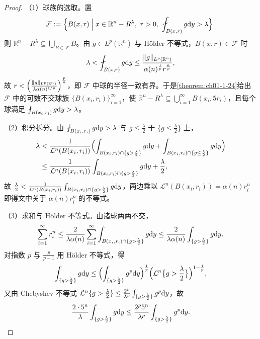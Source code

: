 \documentclass[../../main.tex]{subfiles}%
\begin{document}
\begin{proof}
（1）球族的选取。置
\begin{align*}
\mathcal{F}:=\Bigl\{B(x,r)\Bigm|x\in\mathbb{R}^n-R^\lambda,\ r>0,\ \fint_{B(x,r)}g\diff y>\lambda\Bigr\}.
\end{align*}
则 $\mathbb{R}^n-R^\lambda\subseteq\bigcup_{B\in\mathcal{F}}B$。由 $g\in L^p(\mathbb{R}^n)$ 与 Hölder 不等式，$B(x,r)\in\mathcal{F}$ 时
\begin{align*}
\lambda<\fint_{B(x,r)}g\diff y\le\frac{\lVert g\rVert_{L^p(\mathbb{R}^n)}}{\alpha(n)^{\frac1p}r^{\frac np}},
\end{align*}
故 $r<\Bigl(\frac{\lVert g\rVert_{L^p(\mathbb{R}^n)}}{\lambda\alpha(n)^{1/p}}\Bigr)^{\frac{p}{n}}$，即 $\mathcal{F}$ 中球的半径一致有界。于是\cref{theorem:ch01-1-24}给出 $\mathcal{F}$ 中的可数不交球族 $\{B(x_i,r_i)\}_{i=1}^{\infty}$，使 $\mathbb{R}^n-R^\lambda\subseteq\bigcup_{i=1}^{\infty}B(x_i,5r_i)$，且每个球满足 $\fint_{B(x_i,r_i)}g\diff y>\lambda$。%

（2）积分拆分。由 $\fint_{B(x_i,r_i)}g\diff y>\lambda$ 与 $g\le\frac{\lambda}{2}$ 于 $\{g\le\frac{\lambda}{2}\}$ 上，
\begin{align*}
\lambda&<\frac{1}{\mathcal{L}^n(B(x_i,r_i))}\Bigl(\int_{B(x_i,r_i)\cap\{g>\frac{\lambda}{2}\}}g\mathrm{d} y+\int_{B(x_i,r_i)\cap\{g\le\frac{\lambda}{2}\}}g\mathrm{d} y\Bigr)\\
&\le\frac{1}{\mathcal{L}^n(B(x_i,r_i))}\int_{B(x_i,r_i)\cap\{g>\frac{\lambda}{2}\}}g\mathrm{d} y+\frac{\lambda}{2},
\end{align*}
故 $\frac{\lambda}{2}<\frac{1}{\mathcal{L}^n(B(x_i,r_i))}\int_{B(x_i,r_i)\cap\{g>\frac{\lambda}{2}\}}g\mathrm{d} y$，两边乘以 $\mathcal{L}^n(B(x_i,r_i))=\alpha(n)r_i^n$ 即得文中关于 $\alpha(n)r_i^n$ 的不等式。

（3）求和与 Hölder 不等式。由诸球两两不交，
\begin{align*}
\sum_{i=1}^{\infty}r_i^n\le\frac{2}{\lambda\alpha(n)}\sum_{i=1}^{\infty}\int_{B(x_i,r_i)\cap\{g>\frac{\lambda}{2}\}}g\mathrm{d} y\le\frac{2}{\lambda\alpha(n)}\int_{\{g>\frac{\lambda}{2}\}}g\mathrm{d} y .
\end{align*}
对指数 $p$ 与 $\frac{p}{p-1}$ 用 Hölder 不等式，得
\begin{align*}
\int_{\{g>\frac{\lambda}{2}\}}g\mathrm{d} y\le\Bigl(\int_{\{g>\frac{\lambda}{2}\}}g^p\mathrm{d} y\Bigr)^{\frac1p}\Bigl(\mathcal{L}^n\bigl\{g>\frac{\lambda}{2}\bigr\}\Bigr)^{1-\frac1p},
\end{align*}
又由 Chebyshev 不等式 $\mathcal{L}^n\{g>\frac{\lambda}{2}\}\le\frac{2^p}{\lambda^p}\int_{\{g>\frac{\lambda}{2}\}}g^p\mathrm{d} y$，故
\begin{align*}
\frac{2\cdot5^n}{\lambda}\int_{\{g>\frac{\lambda}{2}\}}g\mathrm{d} y\le\frac{2^p5^n}{\lambda^p}\int_{\{g>\frac{\lambda}{2}\}}g^p\mathrm{d} y .
\end{align*}


\end{proof}
\end{document}
